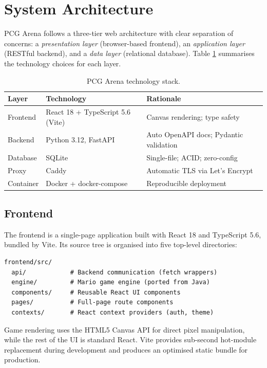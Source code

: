 \documentclass[shortabstract, mgr, english]{iithesis}
\begin{document}
\section{System Architecture}
\label{sec:sd-architecture}

PCG Arena follows a three-tier web architecture with clear separation of concerns:
a \emph{presentation layer} (browser-based frontend), an \emph{application layer}
(RESTful backend), and a \emph{data layer} (relational database). Table \ref{tab:tech-stack}
summarises the technology choices for each layer.

\begin{table}[H]
\centering
\begin{tabular}{lll}
\toprule
\textbf{Layer} & \textbf{Technology} & \textbf{Rationale} \\
\midrule
Frontend  & React 18 + TypeScript 5.6 (Vite) & Canvas rendering; type safety \\
Backend   & Python 3.12, FastAPI              & Auto OpenAPI docs; Pydantic validation \\
Database  & SQLite                            & Single-file; ACID; zero-config \\
Proxy     & Caddy                             & Automatic TLS via Let's Encrypt \\
Container & Docker + docker-compose           & Reproducible deployment \\
\bottomrule
\end{tabular}
\caption{PCG Arena technology stack.}
\label{tab:tech-stack}
\end{table}

\subsection{Frontend}
\label{subsec:sd-frontend}

The frontend is a single-page application built with React 18 and TypeScript 5.6, bundled
by Vite. Its source tree is organised into five top-level directories:

\begin{lstlisting}
frontend/src/
  api/            # Backend communication (fetch wrappers)
  engine/         # Mario game engine (ported from Java)
  components/     # Reusable React UI components
  pages/          # Full-page route components
  contexts/       # React context providers (auth, theme)
\end{lstlisting}

Game rendering uses the HTML5 Canvas API for direct pixel manipulation, while the rest of
the UI is standard React. Vite provides sub-second hot-module replacement during development
and produces an optimised static bundle for production.
\end{document}
